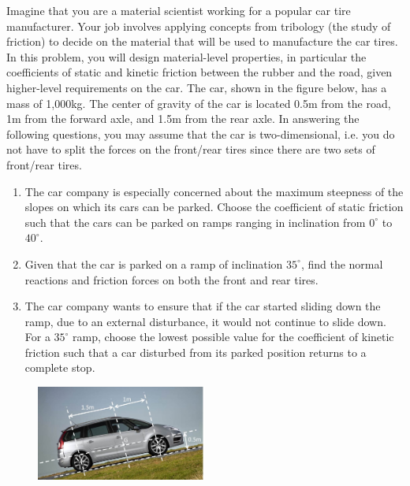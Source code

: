 
Imagine that you are a material scientist working for a popular car tire manufacturer. Your job involves applying concepts from tribology (the study of friction) to decide on the material that will be used to manufacture the car tires. In this problem, you will design material-level properties, in particular the coefficients of static and kinetic friction between the rubber and the road, given higher-level requirements on the car. The car, shown in the figure below, has a mass of 1,000kg. The center of gravity of the car is located 0.5m from the road, 1m from the forward axle, and 1.5m from the rear axle. In answering the following questions, you may assume that the car is two-dimensional, i.e. you do not have to split the forces on the front/rear tires since there are two sets of front/rear tires.

\begin{enumerate}
  \item The car company is especially concerned about the maximum steepness of the slopes on which its cars can be parked. Choose the coefficient of static friction such that the cars can be parked on ramps ranging in inclination from $0^\circ$ to $40^\circ$.  
  \item Given that the car is parked on a ramp of inclination $35^\circ$, find the normal reactions and friction forces on both the front and rear tires.
  \item The car company wants to ensure that if the car started sliding down the ramp, due to an external disturbance, it would not continue to slide down. For a $35^\circ$ ramp, choose the lowest possible value for the coefficient of kinetic friction such that a car disturbed from its parked position returns to a complete stop.
\end{enumerate}

\begin{figure}[ht!]
  \centering
  \includegraphics[width=0.5\textwidth,
	           height=0.2\textheight,
		   keepaspectratio]{fig.png}
\end{figure}

